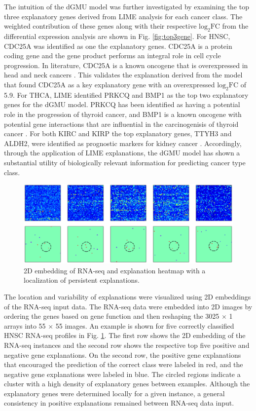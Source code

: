 The intuition of the dGMU model was further investigated by examining the top three explanatory genes derived from LIME analysis for each cancer class. The weighted contribution of these genes along with their respective $\mathrm{log}_2\mathrm{FC}$ from the differential expression analysis are shown in Fig. \ref{fig:top3gene}. For HNSC, CDC25A was identified as one the explanatory genes. CDC25A is a protein coding gene and the gene product performs an integral role in cell cycle progression. In literature, CDC25A is a known oncogene that is overexpressed in head and neck cancers \cite{gasparotto1997overexpression}. This validates the explanation derived from the model that found CDC25A as a key explanatory gene with an overexpressed $\mathrm{log}_2\mathrm{FC}$ of 5.9. For THCA, LIME identified PRKCQ and BMP1 as the top two explanatory genes for the dGMU model. PRKCQ has been identified as having a potential role in the progression of thyroid cancer, and BMP1 is a known oncogene with potential gene interactions that are influential in the carcinogenisis of thyroid cancer \cite{xu2014identification,firek2017pathologic}. For both KIRC and KIRP the top explanatory genes, TTYH3 and ALDH2, were identified as prognostic markers for kidney cancer \cite{uhlen2017pathology}. Accordingly, through the application of LIME explanations, the dGMU model has shown a substantial utility of biologically relevant information for predicting cancer type class.

\begin{figure}[h!]
    \centering
    \includegraphics[width=\textwidth]{img/embgene2.eps}
    \caption{2D embedding of RNA-seq and explanation heatmap with a localization of persistent explanations.}
    \label{fig:2dheatmap}
\end{figure}

The location and variability of explanations were visualized using 2D embeddings of the RNA-seq input data. The RNA-seq data were embedded into 2D images by ordering the genes based on gene function and then reshaping the 3025 $\times$ 1 arrays into 55 $\times$ 55 images. An example is shown for five correctly classified HNSC RNA-seq profiles in Fig. \ref{fig:2dheatmap}. The first row shows the 2D embedding of the RNA-seq instances and the second row shows the respective top five positive and negative gene explanations. On the second row, the positive gene explanations that encouraged the prediction of the correct class were labeled in red, and the negative gene explanations were labeled in blue. The circled regions indicate a cluster with a high density of explanatory genes between examples. Although the explanatory genes were determined locally for a given instance, a general consistency in positive explanations remained between RNA-seq data input. 

